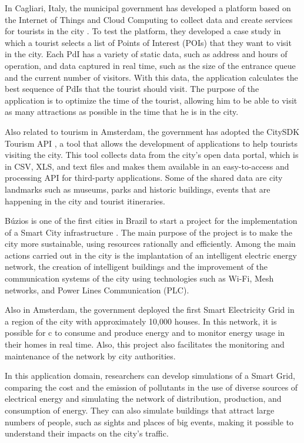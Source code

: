 In Cagliari, Italy, the municipal government has developed a platform based on the Internet of Things and Cloud Computing to collect data and create services for tourists in the city \citep{nitti2017iot}. To test the platform, they developed a case study in which a tourist selects a list of Points of Interest (POIs) that they want to visit in the city. Each PdI has a variety of static data, such as address and hours of operation, and data captured in real time, such as the size of the entrance queue and the current number of visitors. With this data, the application calculates the best sequence of PdIs that the tourist should visit. The purpose of the application is to optimize the time of the tourist, allowing him to be able to visit as many attractions as possible in the time that he is in the city.

Also related to tourism in Amsterdam, the government has adopted the CitySDK Tourism API \citep{pereira2015citysdk}, a tool that allows the development of applications to help tourists visiting the city. This tool collects data from the city's open data portal, which is in CSV, XLS, and text files and makes them available in an easy-to-access and processing API for third-party applications. Some of the shared data are city landmarks such as museums, parks and historic buildings, events that are happening in the city and tourist itineraries.


Búzios is one of the first cities in Brazil to start a project for the implementation of a Smart City infrastructure \citep{fortes2014deployment}. The main purpose of the project is to make the city more sustainable, using resources rationally and efficiently. Among the main actions carried out in the city is the implantation of an intelligent electric energy network, the creation of intelligent buildings and the improvement of the communication systems of the city using technologies such as Wi-Fi, Mesh networks, and Power Lines Communication (PLC).

Also in Amsterdam, the government deployed the first Smart Electricity Grid in a region of the city with approximately 10,000 houses. In this network, it is possible for c to consume and produce energy and to monitor energy usage in their homes in real time. Also, this project also facilitates the monitoring and maintenance of the network by city authorities.

In this application domain, researchers can develop simulations of a Smart Grid, comparing the cost and the emission of pollutants in the use of diverse sources of electrical energy and simulating the network of distribution, production, and consumption of energy. They can also simulate buildings that attract large numbers of people, such as sights and places of big events, making it possible to understand their impacts on the city's traffic.

